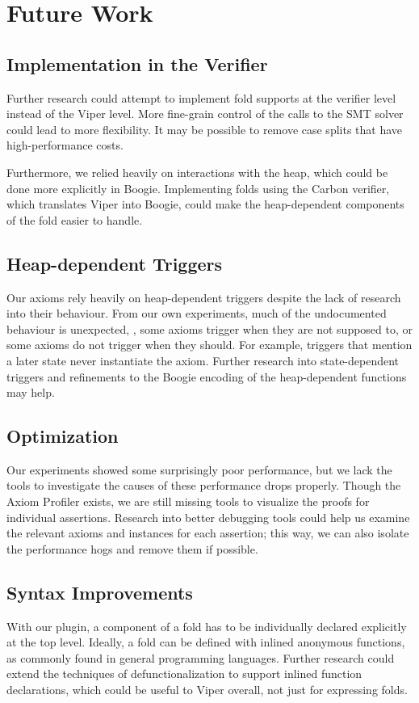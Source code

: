 \documentclass[msc,oneside]{ubcthesis}
\theoremstyle{definition}
\begin{document}
\section{Future Work}
\subsection{Implementation in the Verifier}
Further research could attempt to implement fold supports at the verifier level instead of the Viper level. More fine-grain control of the calls to the SMT solver could lead to more flexibility. It may be possible to remove case splits that have high-performance costs.

Furthermore, we relied heavily on interactions with the heap, which could be done more explicitly in Boogie. Implementing folds using the Carbon verifier, which translates Viper into Boogie, could make the heap-dependent components of the fold easier to handle. 

\subsection{Heap-dependent Triggers}
Our axioms rely heavily on heap-dependent triggers despite the lack of research into their behaviour. From our own experiments, much of the undocumented behaviour is unexpected, \ie, some axioms trigger when they are not supposed to, or some axioms do not trigger when they should. For example, triggers that mention a later state never instantiate the axiom. Further research into state-dependent triggers and refinements to the Boogie encoding of the heap-dependent functions may help. 


\subsection{Optimization}
Our experiments showed some surprisingly poor performance, but we lack the tools to investigate the causes of these performance drops properly. Though the Axiom Profiler exists, we are still missing tools to visualize the proofs for individual assertions. Research into better debugging tools could help us examine the relevant axioms and instances for each assertion; this way, we can also isolate the performance hogs and remove them if possible.

\subsection{Syntax Improvements}
With our plugin, a component of a fold has to be individually declared explicitly at the top level. Ideally, a fold can be defined with inlined anonymous functions, as commonly found in general programming languages. Further research could extend the techniques of defunctionalization to support inlined function declarations, which could be useful to Viper overall, not just for expressing folds.  
\end{document}

